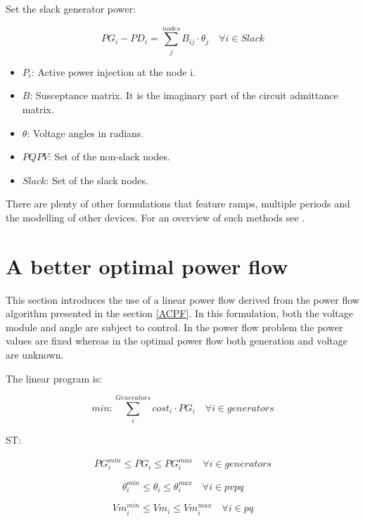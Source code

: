 \documentclass[nols,a4paper,twoside,notoc,fleqn]{tufte-book}
\begin{document}
Set the slack generator power:

\begin{equation}
PG_i - PD_i=\sum_j^{nodes} B_{ij} \cdot \theta_j  \quad  \forall i \in Slack
\end{equation}

\begin{itemize}
	\item $P_i$: Active power injection at the node i.
	\item $B$: Susceptance matrix. It is the imaginary part of the circuit admittance matrix.
	\item $\theta$: Voltage angles in radians.
	\item $PQPV$: Set of the non-slack nodes.
	
	\item $Slack$: Set of the slack nodes.
\end{itemize}

There are plenty of other formulations that feature ramps, multiple periods and the modelling of other devices.
For an overview of such methods see \cite{taylor2015convex}.

\newpage
\section{A better optimal power flow}

This section introduces the use of a linear power flow derived from the power flow algorithm presented in the section \ref{ACPF}. In this formulation, both the voltage module and angle are subject to control. In the power flow problem the power values are fixed whereas in the optimal power flow both generation and voltage are unknown.

The linear program is:

\begin{equation}
min: \sum_i^{Generators} cost_i \cdot PG_i   \quad \forall i \in generators
\end{equation}

ST:

\begin{equation}
PG_i^{min} \leq PG_i \leq PG_i^{max}  \quad \forall i \in generators
\end{equation}

\begin{equation}
\theta_i^{min} \leq \theta_i \leq \theta_i^{max}  \quad \forall i \in pvpq
\end{equation}

\begin{equation}
Vm_i^{min} \leq Vm_i \leq Vm_i^{max}  \quad \forall i \in pq
\end{equation}
\end{document}
